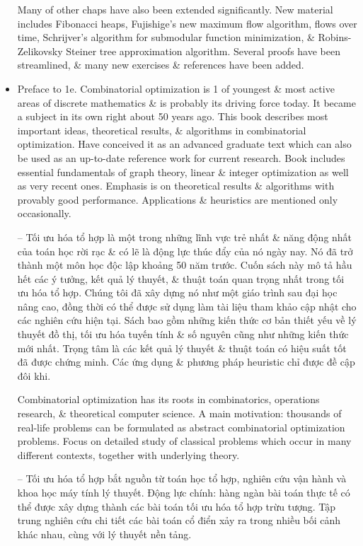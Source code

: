 \documentclass{article}
\begin{document}
\begin{itemize}
    Many of other chaps have also been extended significantly. New material includes Fibonacci heaps, Fujishige's new maximum flow algorithm, flows over time, Schrijver's algorithm for submodular function minimization, \& Robins-Zelikovsky Steiner tree approximation algorithm. Several proofs have been streamlined, \& many new exercises \& references have been added.
    \item {\sf Preface to 1e.} Combinatorial optimization is 1 of youngest \& most active areas of discrete mathematics \& is probably its driving force today. It became a subject in its own right about 50 years ago. This book describes most important ideas, theoretical results, \& algorithms in combinatorial optimization. Have conceived it as an advanced graduate text which can also be used as an up-to-date reference work for current research. Book includes essential fundamentals of graph theory, linear \& integer optimization as well as very recent ones. Emphasis is on theoretical results \& algorithms with provably good performance. Applications \& heuristics are mentioned only occasionally.

    -- Tối ưu hóa tổ hợp là một trong những lĩnh vực trẻ nhất \& năng động nhất của toán học rời rạc \& có lẽ là động lực thúc đẩy của nó ngày nay. Nó đã trở thành một môn học độc lập khoảng 50 năm trước. Cuốn sách này mô tả hầu hết các ý tưởng, kết quả lý thuyết, \& thuật toán quan trọng nhất trong tối ưu hóa tổ hợp. Chúng tôi đã xây dựng nó như một giáo trình sau đại học nâng cao, đồng thời có thể được sử dụng làm tài liệu tham khảo cập nhật cho các nghiên cứu hiện tại. Sách bao gồm những kiến thức cơ bản thiết yếu về lý thuyết đồ thị, tối ưu hóa tuyến tính \& số nguyên cũng như những kiến thức mới nhất. Trọng tâm là các kết quả lý thuyết \& thuật toán có hiệu suất tốt đã được chứng minh. Các ứng dụng \& phương pháp heuristic chỉ được đề cập đôi khi.

    Combinatorial optimization has its roots in combinatorics, operations research, \& theoretical computer science. A main motivation: thousands of real-life problems can be formulated as abstract combinatorial optimization problems. Focus on detailed study of classical problems which occur in many different contexts, together with underlying theory.

    -- Tối ưu hóa tổ hợp bắt nguồn từ toán học tổ hợp, nghiên cứu vận hành và khoa học máy tính lý thuyết. Động lực chính: hàng ngàn bài toán thực tế có thể được xây dựng thành các bài toán tối ưu hóa tổ hợp trừu tượng. Tập trung nghiên cứu chi tiết các bài toán cổ điển xảy ra trong nhiều bối cảnh khác nhau, cùng với lý thuyết nền tảng.


\end{itemize}
\end{document}
